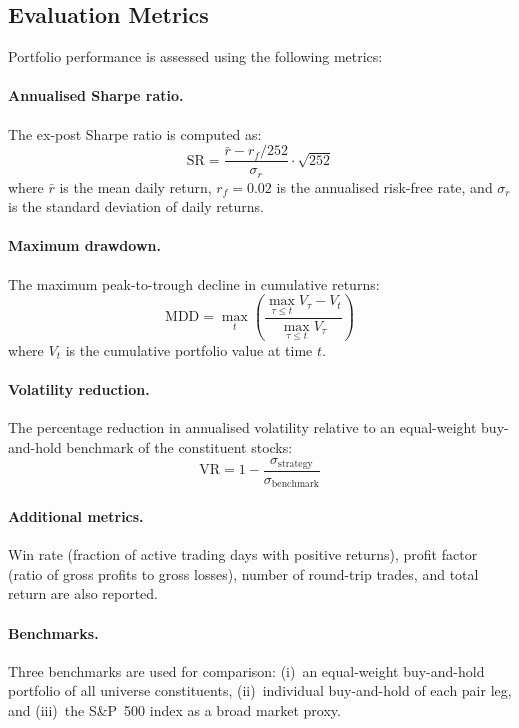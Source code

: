 \documentclass[a4paper]{report}
\begin{document}
\subsection{Evaluation Metrics}

Portfolio performance is assessed using the following metrics:

\paragraph{Annualised Sharpe ratio.} The ex-post Sharpe ratio is computed as:
\begin{equation}
\text{SR} = \frac{\bar{r} - r_f / 252}{\sigma_r} \cdot \sqrt{252}
\label{eq:sharpe}
\end{equation}
where $\bar{r}$ is the mean daily return, $r_f = 0.02$ is the annualised risk-free rate, and $\sigma_r$ is the standard deviation of daily returns.

\paragraph{Maximum drawdown.} The maximum peak-to-trough decline in cumulative returns:
\begin{equation}
\text{MDD} = \max_{t} \left(\frac{\max_{\tau \leq t} V_\tau - V_t}{\max_{\tau \leq t} V_\tau}\right)
\label{eq:mdd}
\end{equation}
where $V_t$ is the cumulative portfolio value at time $t$.

\paragraph{Volatility reduction.} The percentage reduction in annualised volatility relative to an equal-weight buy-and-hold benchmark of the constituent stocks:
\begin{equation}
\text{VR} = 1 - \frac{\sigma_{\text{strategy}}}{\sigma_{\text{benchmark}}}
\label{eq:vol_reduction}
\end{equation}

\paragraph{Additional metrics.} Win rate (fraction of active trading days with positive returns), profit factor (ratio of gross profits to gross losses), number of round-trip trades, and total return are also reported.

\paragraph{Benchmarks.} Three benchmarks are used for comparison: (i)~an equal-weight buy-and-hold portfolio of all universe constituents, (ii)~individual buy-and-hold of each pair leg, and (iii)~the S\&P~500 index as a broad market proxy.
\end{document}
